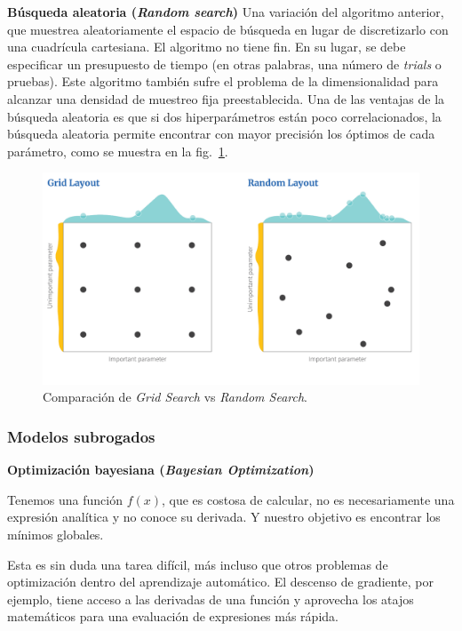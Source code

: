 \documentclass[a4paper,12pt]{article}
\begin{document}
\textbf{Búsqueda aleatoria (\textit{Random search})}
Una variación del algoritmo anterior, que muestrea aleatoriamente el espacio de búsqueda en lugar de discretizarlo con una cuadrícula cartesiana. El algoritmo no tiene fin. En su lugar, se debe especificar un presupuesto de tiempo (en otras palabras, una número de \textit{trials} o pruebas). Este algoritmo también sufre el problema de la dimensionalidad para alcanzar una densidad de muestreo fija preestablecida. Una de las ventajas de la búsqueda aleatoria es que si dos hiperparámetros están poco correlacionados, la búsqueda aleatoria permite encontrar con mayor precisión los óptimos de cada parámetro, como se muestra en la fig.~\ref{fig:grid_vs_search}. 

\begin{figure}[H]
	\begin{center}
	\includegraphics[width=1\textwidth]{grid_vs_search_v3.png}
  	\caption{Comparación de \textit{Grid Search} vs \textit{Random Search}.}
  	\label{fig:grid_vs_search}
  	\end{center}
\end{figure}

\subsubsection{Modelos subrogados}

\textbf{Optimización bayesiana (\textit{Bayesian Optimization})} 

Tenemos una función $f(x)$, que es costosa de calcular, no es necesariamente una expresión analítica y no conoce su derivada. Y nuestro objetivo es encontrar los mínimos globales. \citep{Ye2020Oct}

Esta es sin duda una tarea difícil, más incluso que otros problemas de optimización dentro del aprendizaje automático. El descenso de gradiente, por ejemplo, tiene acceso a las derivadas de una función y aprovecha los atajos matemáticos para una evaluación de expresiones más rápida.
\end{document}
